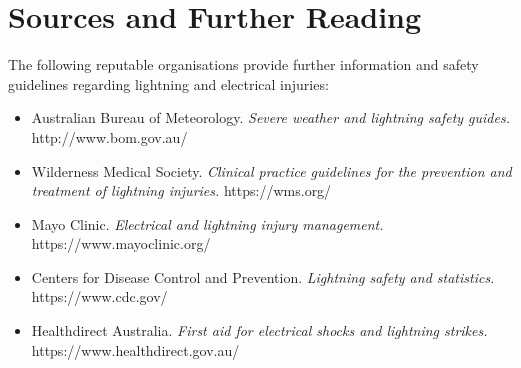 \section*{Sources and Further Reading}
The following reputable organisations provide further information and safety guidelines regarding lightning and electrical injuries:
\begin{itemize}
    \item Australian Bureau of Meteorology. \textit{Severe weather and lightning safety guides.} http://www.bom.gov.au/
    \item Wilderness Medical Society. \textit{Clinical practice guidelines for the prevention and treatment of lightning injuries.} https://wms.org/
    \item Mayo Clinic. \textit{Electrical and lightning injury management.} https://www.mayoclinic.org/
    \item Centers for Disease Control and Prevention. \textit{Lightning safety and statistics.} https://www.cdc.gov/
    \item Healthdirect Australia. \textit{First aid for electrical shocks and lightning strikes.} https://www.healthdirect.gov.au/
\end{itemize}
